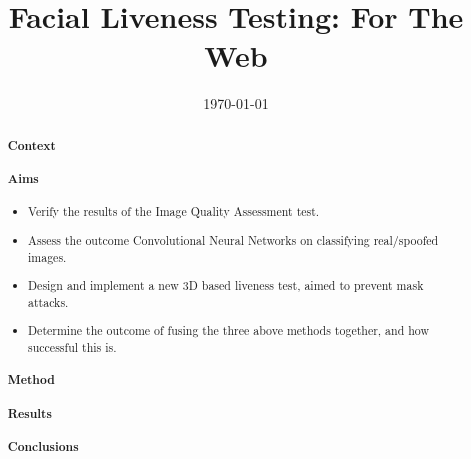 \documentclass[10pt,a4paper]{article}
\title{Facial Liveness Testing: For The Web}
\author{} %
\date{\today}
\begin{document}
\maketitle

\begin{abstract}

\paragraph{Context}

\paragraph{Aims}
    \begin{itemize}
        \item Verify the results of the Image Quality Assessment test.
        \item Assess the outcome Convolutional Neural Networks on classifying real/spoofed images.
        \item Design and implement a new 3D based liveness test, aimed to prevent mask attacks.
        \item Determine the outcome of fusing the three above methods together, and how successful this is.
    \end{itemize}

\paragraph{Method}
   
\paragraph{Results}
\paragraph{Conclusions}

\end{abstract}
\end{document}
